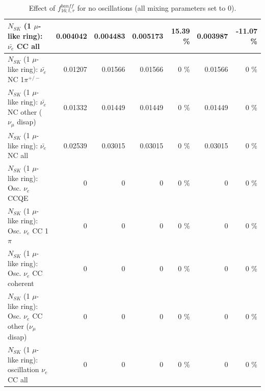 \begin{table}
\begin{tabular}{| l | r | r | r  r | r  r |}
                            $N_{SK}$ (1 $\mu$-like ring): $\bar{\nu_{e}}$ CC all &        0.004042 &        0.004483 &        0.005173 &    15.39 \%  &        0.003987 &   -11.07 \%  \\ 
\hline
                     $N_{SK}$ (1 $\mu$-like ring): $\bar{\nu_e}$ NC 1$\pi^{+/-}$ &         0.01207 &         0.01566 &         0.01566 &        0 \%  &         0.01566 &        0 \%  \\ 
          $N_{SK}$ (1 $\mu$-like ring): $\bar{\nu_e}$ NC other ($\nu_\mu$ disap) &         0.01332 &         0.01449 &         0.01449 &        0 \%  &         0.01449 &        0 \%  \\ 
                            $N_{SK}$ (1 $\mu$-like ring): $\bar{\nu_{e}}$ NC all &         0.02539 &         0.03015 &         0.03015 &        0 \%  &         0.03015 &        0 \%  \\ 
\hline
\hline
\hline
                                 $N_{SK}$ (1 $\mu$-like ring): Osc. $\nu_e$ CCQE &               0 &               0 &               0 &        0 \%  &               0 &        0 \%  \\ 
                            $N_{SK}$ (1 $\mu$-like ring): Osc. $\nu_e$ CC 1$\pi$ &               0 &               0 &               0 &        0 \%  &               0 &        0 \%  \\ 
                          $N_{SK}$ (1 $\mu$-like ring): Osc. $\nu_e$ CC coherent &               0 &               0 &               0 &        0 \%  &               0 &        0 \%  \\ 
           $N_{SK}$ (1 $\mu$-like ring): Osc. $\nu_e$ CC other ($\nu_\mu$ disap) &               0 &               0 &               0 &        0 \%  &               0 &        0 \%  \\ 
                        $N_{SK}$ (1 $\mu$-like ring): oscillation $\nu_e$ CC all &               0 &               0 &               0 &        0 \%  &               0 &        0 \%  \\ 
\hline
\hline
\end{tabular}
\caption{ Effect of $f_{16; t, r}^{banff}$ for no oscillations (all mixing parameters set to 0). }
\label{tab:num_banff_maqe_1RmuT_3f_osc_t13:0}
\end{table}
\clearpage
